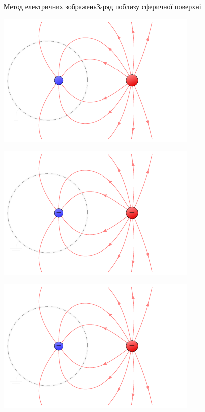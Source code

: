 \documentclass{beamer}
\begin{document}
\begin{frame}{Метод електричних зображень}{Заряд поблизу сферичної поверхні}
\begin{overprint}
\begin{center}
		\end{center}
		\begin{center}
			\includegraphics[page=2]{mirrorsphere}
		\end{center}
		\begin{center}
			\includegraphics[page=3]{mirrorsphere}
		\end{center}
		\begin{center}
			\includegraphics[page=4]{mirrorsphere}
		\end{center}
	\end{overprint}
\end{frame}
\end{document}
